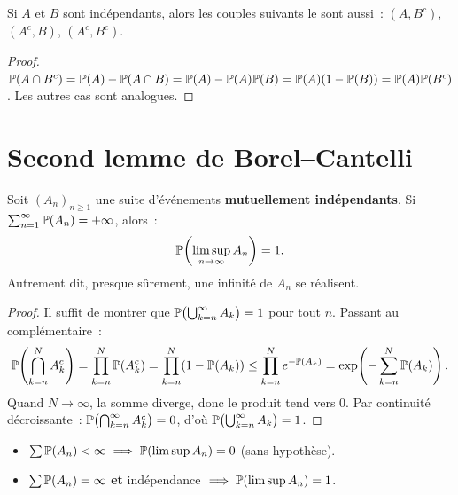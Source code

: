 \begin{proposition}
Si $A$ et $B$ sont ind\'ependants, alors les couples suivants le sont aussi~:
$(A, B^c)$, $(A^c, B)$, $(A^c, B^c)$.
\end{proposition}

\begin{proof}
$\mathbb{P}(A \cap B^c) = \mathbb{P}(A) - \mathbb{P}(A \cap B) = \mathbb{P}(A) - \mathbb{P}(A)\mathbb{P}(B)
= \mathbb{P}(A)(1 - \mathbb{P}(B)) = \mathbb{P}(A)\mathbb{P}(B^c)$.
Les autres cas sont analogues.
\end{proof}

\section{Second lemme de Borel--Cantelli}

\begin{theoreme}
\label{thm:borel_cantelli_2}
Soit $(A_n)_{n \geq 1}$ une suite d'\'ev\'enements \textbf{mutuellement
ind\'ependants}. Si $\sum_{n=1}^{\infty} \mathbb{P}(A_n) = +\infty$, alors~:
\[
    \mathbb{P}\!\left(\limsup_{n \to \infty} A_n\right) = 1.
\]
Autrement dit, presque s\^urement, une infinit\'e de $A_n$ se r\'ealisent.
\end{theoreme}

\begin{proof}
Il suffit de montrer que $\mathbb{P}\bigl(\bigcup_{k=n}^{\infty} A_k\bigr) = 1$
pour tout $n$. Passant au compl\'ementaire~:
\[
    \mathbb{P}\!\left(\bigcap_{k=n}^{N} A_k^c\right)
    = \prod_{k=n}^{N} \mathbb{P}(A_k^c)
    = \prod_{k=n}^{N} (1 - \mathbb{P}(A_k))
    \leq \prod_{k=n}^{N} e^{-\mathbb{P}(A_k)}
    = \exp\!\left(-\sum_{k=n}^{N} \mathbb{P}(A_k)\right).
\]
Quand $N \to \infty$, la somme diverge, donc le produit tend vers 0. Par
continuit\'e d\'ecroissante~:
$\mathbb{P}\bigl(\bigcap_{k=n}^{\infty} A_k^c\bigr) = 0$, d'o\`u
$\mathbb{P}\bigl(\bigcup_{k=n}^{\infty} A_k\bigr) = 1$.
\end{proof}

\begin{formules}[title=\textbf{R\'esum\'e : Borel--Cantelli}]
\begin{itemize}
    \item $\sum \mathbb{P}(A_n) < \infty \implies \mathbb{P}(\limsup A_n) = 0$ \quad (sans hypoth\`ese).
    \item $\sum \mathbb{P}(A_n) = \infty$ \textbf{et} ind\'ependance
          $\implies \mathbb{P}(\limsup A_n) = 1$.
\end{itemize}
\end{formules}

